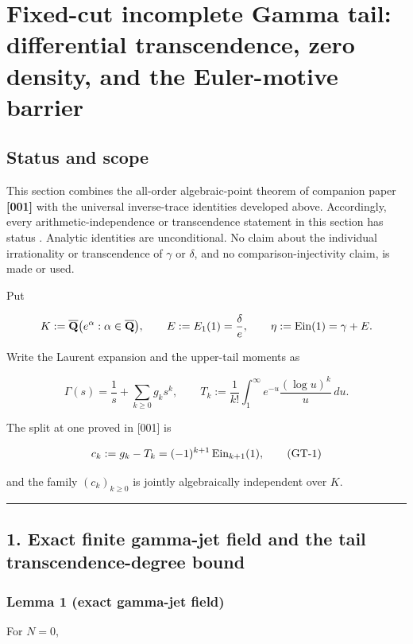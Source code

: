 \section{Fixed-cut incomplete Gamma tail: differential transcendence, zero density, and the Euler-motive barrier}

\subsection{Status and scope}

This section combines the all-order algebraic-point theorem of companion
paper \textbf{[001]} with the universal inverse-trace identities developed
above.  Accordingly, every arithmetic-independence or transcendence statement
in this section has status \RPASS{}.  Analytic identities are unconditional.
No claim about the individual irrationality or transcendence of \(\gamma\)
or \(\delta\), and no comparison-injectivity claim, is made or used.

Put

\[
 K:=\overline{\mathbf Q}\bigl(e^\alpha:\alpha\in\overline{\mathbf Q}\bigr),
 \qquad E:=E_1(1)=\frac{\delta}{e},
 \qquad \eta:=\operatorname{Ein}(1)=\gamma+E .
\]

Write the Laurent expansion and the upper-tail moments as

\[
 \Gamma(s)=\frac1s+\sum_{k\ge0}g_ks^k,
 \qquad
 T_k:=\frac1{k!}\int_1^\infty e^{-u}\frac{(\log u)^k}{u}\,du .
\]

The split at one proved in {[}001{]} is

\[
 c_k:=g_k-T_k=(-1)^{k+1}\operatorname{Ein}_{k+1}(1),                         \tag{GT-1}
\]

and the family \((c_k)_{k\ge0}\) is jointly algebraically independent over \(K\).

\begin{center}\rule{0.5\linewidth}{0.5pt}\end{center}

\subsection{1. Exact finite gamma-jet field and the tail transcendence-degree bound}

\subsubsection{Lemma 1 (exact gamma-jet field)}

For \(N=0\),

